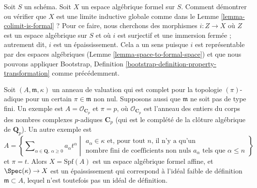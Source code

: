\noindent
Soit $S$ un schéma. Soit $X$ un espace algébrique formel sur $S$.
Comment démontrer ou vérifier que $X$ est une limite inductive globale comme dans le
Lemme \ref{lemma-colimit-is-formal} ? Pour ce faire, nous cherchons des morphismes
$i : Z \to X$ où $Z$ est un espace algébrique sur $S$ et où $i$ est
surjectif et une immersion fermée ; autrement dit, $i$ est un épaississement.
Cela a un sens puisque $i$ est représentable par des espaces algébriques
(Lemme \ref{lemma-space-to-formal-space}) et que nous pouvons appliquer
Bootstrap, Definition \ref{bootstrap-definition-property-transformation}
comme précédemment.

\begin{example}
\label{example-david-hansen}
Soit $(A, \mathfrak m, \kappa)$ un anneau de valuation qui est
complet pour la topologie $(\pi)$-adique pour un certain $\pi \in \mathfrak m$ non nul.
Supposons aussi que $\mathfrak m$ ne soit pas de type fini.
Un exemple est $A = \mathcal{O}_{\mathbf{C}_p}$ et $\pi = p$,
où $\mathcal{O}_{\mathbf{C}_p}$ est l'anneau des entiers
du corps des nombres complexes $p$-adiques $\mathbf{C}_p$
(qui est le complété de la clôture algébrique de
$\mathbf{Q}_p$). Un autre exemple est
$$
A =
\left\{
\sum\nolimits_{\alpha \in \mathbf{Q},\ \alpha \geq 0} a_\alpha t^\alpha
\middle|
\begin{matrix}
a_\alpha \in \kappa \text{ et, pour tout }n\text{, il n'y a qu'un} \\
\text{nombre fini de coefficients non nuls }a_\alpha
\text{ tels que }\alpha \leq n
\end{matrix}
\right\}
$$
et $\pi = t$. Alors $X = \text{Spf}(A)$ est un espace algébrique formel
affine, et $\Spec(\kappa) \to X$ est un épaississement qui correspond
à l'idéal faible de définition $\mathfrak m \subset A$,
lequel n'est toutefois pas un idéal de définition.
\end{example}

